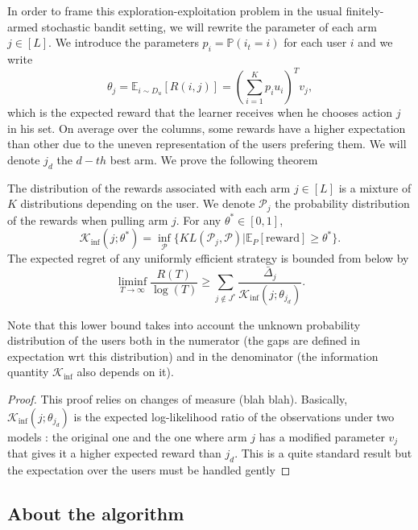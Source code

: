 In order to frame this exploration-exploitation problem in the usual finitely-armed stochastic bandit setting, we will rewrite the parameter of each arm $j\in [L]$. We introduce the
parameters $p_i = \mathds{P}(i_t =i)$ for each user $i$ and we write
\[
\theta_j = \mathds{E}_{i\sim D_u}[R(i,j)] = \left(\sum_{i=1}^K p_i u_i\right)^T v_j,
\]
which is the expected reward that the learner receives when he chooses action $j$ in his set.
On average over the columns, some rewards have a higher expectation than other due to the
uneven representation of the users prefering them. We will denote $j_d$ the $d-th$ best
arm.
We prove the following theorem
\begin{theorem}
The distribution of the rewards associated with each arm $j \in [L]$ is a mixture
of $K$ distributions depending on the user. We denote $\mathcal{P}_j$ the
probability distribution of the rewards when pulling arm $j$. For any $\theta^* \in [0,1]$,
\begin{equation}
\label{eq:kinf}
\mathcal{K}_{\text{inf}}(j;\theta^*) = \inf_{\mathcal{P}}\{KL(\mathcal{P}_j,\mathcal{P})| \mathds{E}_{P}[\text{reward}]\geq \theta^*\}.
\end{equation}
The expected regret of any uniformly efficient strategy is bounded from below by
\[
\liminf_{T\to \infty} \frac{R(T)}{\log(T)} \geq \sum_{j\notin J^*} \frac{\bar{\Delta}_j}{\mathcal{K}_{\text{inf}}(j; \theta_{j_d})}.
\]
\end{theorem}

Note that this lower bound takes into account the unknown probability distribution
of the users both in the numerator (the gaps are defined in expectation wrt this distribution)
and in the denominator (the information quantity $\mathcal{K}_{\text{inf}}$ also depends on it).

\begin{proof}
This proof relies on changes of measure (blah blah).
Basically, $\mathcal{K}_{\text{inf}}(j;\theta_{j_d})$ is the expected log-likelihood ratio
of the observations under two models : the original one and the one where arm $j$
has a modified parameter $v_j$ that gives it a higher expected reward than $j_d$.
This is a quite standard result but the expectation over the users must be handled gently
\end{proof}

\subsection{About the algorithm}

